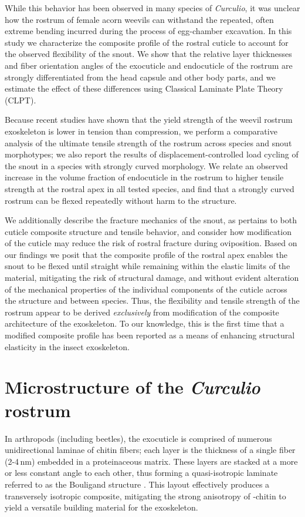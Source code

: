 \documentclass[twocolumn, linenumbers, superscriptaddress]{revtex4-1}
\begin{document}
{	While this behavior has been observed in many species of \textit{Curculio}, it was unclear how the rostrum of female acorn weevils can withstand the repeated, often extreme bending incurred during the process of egg-chamber excavation.
	In this study we characterize the composite profile of the rostral cuticle to account for the observed flexibility of the snout.
	We show that the relative layer thicknesses and fiber orientation angles of the exocuticle and endocuticle of the rostrum are strongly differentiated from the head capsule and other body parts, and we estimate the effect of these differences using Classical Laminate Plate Theory (CLPT).
	
	Because recent studies have shown that the yield strength of the weevil rostrum exoskeleton is lower in tension than compression, we perform a comparative analysis of the ultimate tensile strength of the rostrum across species and snout morphotypes; we also report the results of displacement-controlled load cycling of the snout in a species with strongly curved morphology.
	We relate an observed increase in the volume fraction of endocuticle in the rostrum to higher tensile strength at the rostral apex in all tested species, and find that a strongly curved rostrum can be flexed repeatedly without harm to the structure.
	
	We additionally describe the fracture mechanics of the snout, as pertains to both cuticle composite structure and tensile behavior, and consider how modification of the cuticle may reduce the risk of rostral fracture during oviposition.
	Based on our findings we posit that the composite profile of the rostral apex enables the snout to be flexed until straight while remaining within the elastic limits of the material, mitigating the risk of structural damage, and without evident alteration of the mechanical properties of the individual components of the cuticle across the structure and between species.
	Thus, the flexibility and tensile strength of the rostrum appear to be derived \emph{exclusively} from modification of the composite architecture of the exoskeleton.
	To our knowledge, this is the first time that a modified composite profile has been reported as a means of enhancing structural elasticity in the insect exoskeleton.
}	
	\section{Microstructure of the \textit{Curculio} rostrum}
		In arthropods (including beetles), the exocuticle is comprised of numerous unidirectional laminae of chitin fibers; each layer is the thickness of a single fiber (2-4\,nm) embedded in a proteinaceous matrix.
		These layers are stacked at a more or less constant angle to each other, thus forming a quasi-isotropic laminate referred to as the Bouligand structure \cite{Blackwell1980,Bouligand1972,Neville1976}. 
		This layout effectively produces a transversely isotropic composite, mitigating the strong anisotropy of \textalpha-chitin to yield a versatile building material for the exoskeleton.
		
\end{document}
